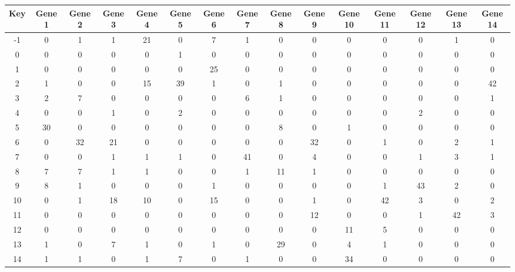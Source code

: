 \begin{tabular}{|c|c|c|c|c|c|c|c|c|c|c|c|c|c|c|}
\hline
Key & Gene 1 & Gene 2 & Gene 3 & Gene 4 & Gene 5 & Gene 6 & Gene 7 & Gene 8 & Gene 9 & Gene 10 & Gene 11 & Gene 12 & Gene 13 & Gene 14 \\
\hline
-1 & 0 & 1 & 1 & 21 & 0 & 7 & 1 & 0 & 0 & 0 & 0 & 0 & 1 & 0 \\
0 & 0 & 0 & 0 & 0 & 1 & 0 & 0 & 0 & 0 & 0 & 0 & 0 & 0 & 0 \\
1 & 0 & 0 & 0 & 0 & 0 & 25 & 0 & 0 & 0 & 0 & 0 & 0 & 0 & 0 \\
2 & 1 & 0 & 0 & 15 & 39 & 1 & 0 & 1 & 0 & 0 & 0 & 0 & 0 & 42 \\
3 & 2 & 7 & 0 & 0 & 0 & 0 & 6 & 1 & 0 & 0 & 0 & 0 & 0 & 1 \\
4 & 0 & 0 & 1 & 0 & 2 & 0 & 0 & 0 & 0 & 0 & 0 & 2 & 0 & 0 \\
5 & 30 & 0 & 0 & 0 & 0 & 0 & 0 & 8 & 0 & 1 & 0 & 0 & 0 & 0 \\
6 & 0 & 32 & 21 & 0 & 0 & 0 & 0 & 0 & 32 & 0 & 1 & 0 & 2 & 1 \\
7 & 0 & 0 & 1 & 1 & 1 & 0 & 41 & 0 & 4 & 0 & 0 & 1 & 3 & 1 \\
8 & 7 & 7 & 1 & 1 & 0 & 0 & 1 & 11 & 1 & 0 & 0 & 0 & 0 & 0 \\
9 & 8 & 1 & 0 & 0 & 0 & 1 & 0 & 0 & 0 & 0 & 1 & 43 & 2 & 0 \\
10 & 0 & 1 & 18 & 10 & 0 & 15 & 0 & 0 & 1 & 0 & 42 & 3 & 0 & 2 \\
11 & 0 & 0 & 0 & 0 & 0 & 0 & 0 & 0 & 12 & 0 & 0 & 1 & 42 & 3 \\
12 & 0 & 0 & 0 & 0 & 0 & 0 & 0 & 0 & 0 & 11 & 5 & 0 & 0 & 0 \\
13 & 1 & 0 & 7 & 1 & 0 & 1 & 0 & 29 & 0 & 4 & 1 & 0 & 0 & 0 \\
14 & 1 & 1 & 0 & 1 & 7 & 0 & 1 & 0 & 0 & 34 & 0 & 0 & 0 & 0 \\
\hline
\end{tabular}